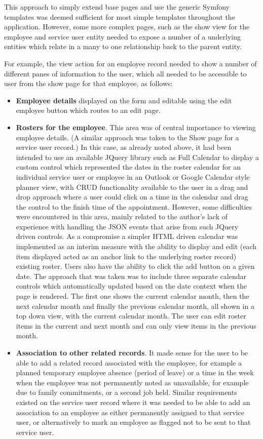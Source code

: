 \documentclass[a4paper,Times New Roman 11pt]{article}
\begin{document}
This approach to simply extend base pages and use the generic Symfony templates was deemed sufficient for most simple templates throughout the application. However, some more complex pages, such as the show view for the employee and service user entity needed to expose a number of a underlying entities which relate in a many to one relationship back to the parent entity.

For example, the view action for an employee record needed to show a number of different panes of information to the user, which all needed to be accessible to user from the show page for that employee, as follows:

\begin {itemize}

\item \textbf{Employee details} displayed on the form and editable using the edit employee button which routes to an edit page.
\item \textbf{Rosters for the employee}. This area was of central importance to viewing employee details. (A similar approach was taken to the Show page for a service user record.) In this case, as already noted above, it had been intended to use an available JQuery library such as Full Calendar to display a custom control which represented the dates in the roster calendar for an individual service user or employee in an Outlook or Google Calendar style planner view, with CRUD functionality available to the user in a drag and drop approach where a user could click on a time in the calendar and drag the control to the finish time of the appointment. However, some difficulties were encountered in this area, mainly related to the author's lack of experience with handling the JSON events that arise from such JQuery driven controls. As a compromise a simpler HTML driven calendar was implemented as an interim measure with the ability to display and edit (each item displayed acted as an anchor link to the underlying roster record) existing roster. Users also have the ability to click the add button on a given date. The approach that was taken was to include three separate calendar controls which automatically updated based on the date context when the page is rendered. The first one shows the current calendar month, then the next calendar month and finally the previous calendar month, all shown in a top down view, with the current calendar month. The user can edit roster items in the current and next month and can only view items in the previous month.
\item \textbf{Association to other related records}. It made sense for the user to be able to add a related record associated with the employee, for example a planned temporary employee absence (period of leave) or a time in the week when the employee was not permanently noted as unavailable, for example due to family commitments, or a second job held. Similar requirements existed on the service user record where it was needed to be able to add an association to an employee as either permanently assigned to that service user, or alternatively to mark an employee as flagged not to be sent to that service user.

\end{itemize}
\end{document}
